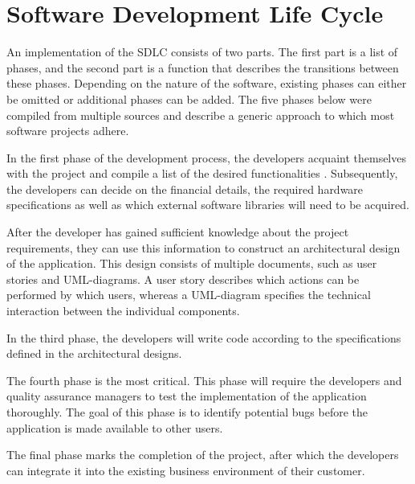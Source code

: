 
\section{Software Development Life Cycle}\label{sec:se-sdlc}
An implementation of the SDLC consists of two parts. The first part is a list of phases, and the second part is a function that describes the transitions between these phases. Depending on the nature of the software, existing phases can either be omitted or additional phases can be added. The five phases below were compiled from multiple sources \cite{2010govardhan, 7106435} and describe a generic approach to which most software projects adhere.
\begin{enumerate}
	 In the first phase of the development process, the developers acquaint themselves with the project and compile a list of the desired functionalities \cite{7106435}. Subsequently, the developers can decide on the financial details, the required hardware specifications as well as which external software libraries will need to be acquired.
	
	 After the developer has gained sufficient knowledge about the project requirements, they can use this information to construct an architectural design of the application. This design consists of multiple documents, such as user stories and UML-diagrams. A user story describes which actions can be performed by which users, whereas a UML-diagram specifies the technical interaction between the individual components.
	
	 In the third phase, the developers will write code according to the specifications defined in the architectural designs.
	
	 The fourth phase is the most critical. This phase will require the developers and quality assurance managers to test the implementation of the application thoroughly. The goal of this phase is to identify potential bugs before the application is made available to other users.
	
	 The final phase marks the completion of the project, after which the developers can integrate it into the existing business environment of their customer.
\end{enumerate}

